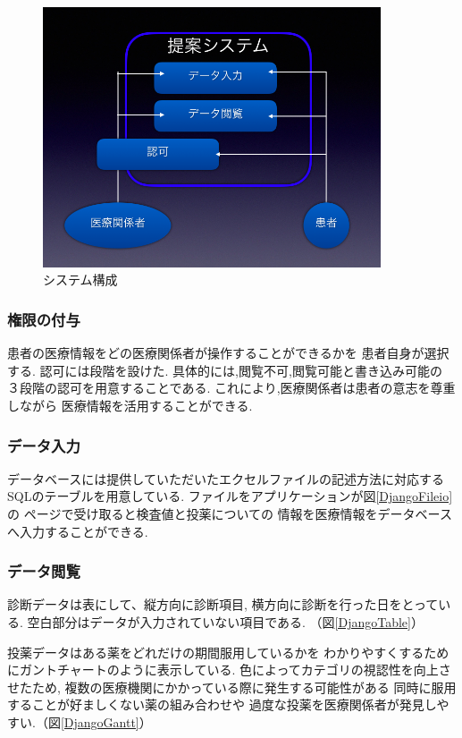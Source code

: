   \begin{figure}[htbp]
    \begin{center}
      \includegraphics[width=10cm, bb=0 0 738 568]{./gazou/system_construct.png}
    \end{center}
    \caption{システム構成}
    \label{system_construct}
  \end{figure}

  \subsubsection{権限の付与}
    患者の医療情報をどの医療関係者が操作することができるかを
    患者自身が選択する.
    認可には段階を設けた.
    具体的には,閲覧不可,閲覧可能と書き込み可能の
    ３段階の認可を用意することである.
    これにより,医療関係者は患者の意志を尊重しながら
    医療情報を活用することができる.


  \subsubsection{データ入力}
    データベースには提供していただいたエクセルファイルの記述方法に対応する
    SQLのテーブルを用意している.
    ファイルをアプリケーションが図\ref{DjangoFileio}の
    ページで受け取ると検査値と投薬についての
    情報を医療情報をデータベースへ入力することができる.

  \subsubsection{データ閲覧}
    診断データは表にして、縦方向に診断項目,
    横方向に診断を行った日をとっている.
    空白部分はデータが入力されていない項目である.
    （図\ref{DjangoTable}）


    投薬データはある薬をどれだけの期間服用しているかを
    わかりやすくするためにガントチャートのように表示している.
    色によってカテゴリの視認性を向上させたため,
    複数の医療機関にかかっている際に発生する可能性がある
    同時に服用することが好ましくない薬の組み合わせや
    過度な投薬を医療関係者が発見しやすい.（図\ref{DjangoGantt}）



